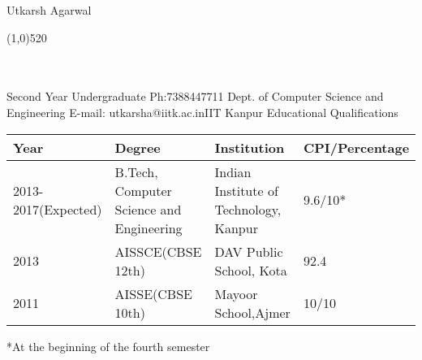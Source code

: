 \documentclass{article}
\begin{document}
\sffamily
\begin{flushleft}
{\Huge{Utkarsh Agarwal}}
\end{flushleft}
\begin{spacing}{0.3}
\line(1,0){520}\\
\\
\\
\end{spacing}
{\small Second Year Undergraduate \hspace{300pt} Ph:7388447711\newline
       Dept. of Computer Science and Engineering \hspace{236pt} E-mail: utkarsha@iitk.ac.in\newline IIT Kanpur\newline}
\newline
\newline
{\Large Educational Qualifications}
\newline
\newline
\begin{tabular}{| l | l | l |l|}
\hline
Year         & Degree & Institution & CPI/Percentage\\ \hline
2013-2017(Expected) & B.Tech, Computer Science and Engineering & Indian Institute of Technology, Kanpur & 9.6/10*\\ \hline
2013 & AISSCE(CBSE 12th) & DAV Public School, Kota & 92.4 \\ \hline
2011 & AISSE(CBSE 10th) & Mayoor School,Ajmer & 10/10\\ \hline
\end{tabular}
*At the beginning of the fourth semester \newline\newline\newline
\end{document}
